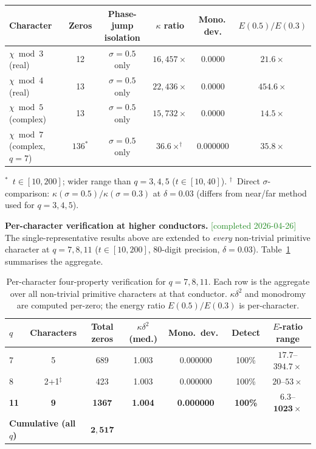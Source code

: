 \documentclass[11pt, a4paper]{article}
\theoremstyle{definition}
\theoremstyle{plain}
\begin{document}
\begin{center}
\small
\begin{tabular}{lccccc}
\toprule
\textbf{Character} & \textbf{Zeros} & \textbf{Phase-jump isolation}
  & \textbf{$\kappa$ ratio} & \textbf{Mono.\,dev.}
  & \textbf{$E(0.5)/E(0.3)$} \\
\midrule
$\chi\bmod 3$ (real)    & 12 & $\sigma{=}0.5$ only & $16{,}457\times$ & 0.0000 & $21.6\times$ \\
$\chi\bmod 4$ (real)    & 13 & $\sigma{=}0.5$ only & $22{,}436\times$ & 0.0000 & $454.6\times$ \\
$\chi\bmod 5$ (complex) & 13 & $\sigma{=}0.5$ only & $15{,}732\times$ & 0.0000 & $14.5\times$ \\
$\chi\bmod 7$ (complex, $q{=}7$) & $136^*$ & $\sigma{=}0.5$ only & $36.6\times^{\dagger}$ & 0.000000 & $35.8\times$ \\
\bottomrule
\end{tabular}
\end{center}
{\small ${}^*$~$t\in[10,200]$; wider range than $q=3,4,5$ ($t\in[10,40]$). \quad
${}^{\dagger}$~Direct $\sigma$-comparison: $\kappa(\sigma{=}0.5)/\kappa(\sigma{=}0.3)$ at
$\delta{=}0.03$ (differs from near/far method used for $q=3,4,5$).}

\medskip\noindent
\textbf{Per-character verification at higher conductors.}
\textcolor{ForestGreen}{[completed 2026-04-26]}
The single-representative results above are extended to
\emph{every} non-trivial primitive character at $q = 7, 8, 11$
($t\in[10,200]$, 80-digit precision, $\delta{=}0.03$).
Table~\ref{tab:dirichlet_per_character} summarises the aggregate.

\begin{table}[h]
\centering
\caption{Per-character four-property verification for $q = 7, 8, 11$.
Each row is the aggregate over all non-trivial primitive characters
at that conductor.  $\kappa\delta^2$ and monodromy are computed
per-zero; the energy ratio $E(0.5)/E(0.3)$ is per-character.}
\label{tab:dirichlet_per_character}
\small
\begin{tabular}{lcccccc}
\toprule
$q$ & Characters & Total zeros & $\kappa\delta^2$ (med.)
  & Mono.\ dev.\ & Detect & $E$-ratio range \\
\midrule
7 & 5 & 689 & 1.003 & 0.000000 & 100\% & $17.7$--$394.7\times$ \\
8 & 2+1${}^\ddagger$ & 423 & 1.003 & 0.000000 & 100\% & $20$--$53\times$ \\
\textbf{11} & \textbf{9} & \textbf{1367} & \textbf{1.004} & \textbf{0.000000}
  & \textbf{100\%} & $\mathbf{6.3}$--$\mathbf{1023\times}$ \\
\midrule
\multicolumn{2}{l}{\textbf{Cumulative (all $q$)}} & $\mathbf{2{,}517}$ & & & & \\
\bottomrule
\end{tabular}
\end{table}
\end{document}
